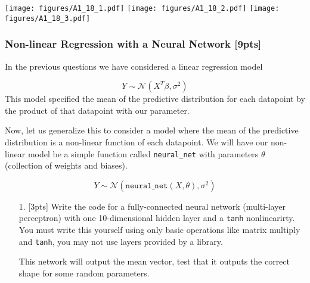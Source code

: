 \documentclass[12pt,a4paper]{article}
\begin{document}
\texttt{[image: figures/A1\_18\_1.pdf]}
\texttt{[image: figures/A1\_18\_2.pdf]}
\texttt{[image: figures/A1\_18\_3.pdf]}

\subsubsection{Non-linear Regression with a Neural Network [9pts]}
In the previous questions we have considered a linear regression model

\[
Y \sim \mathcal{N}(X^T \beta, \sigma^2)
\]
This model specified the mean of the predictive distribution for each datapoint by the product of that datapoint with our parameter.

Now, let us generalize this to consider a model where the mean of the predictive distribution is a non-linear function of each datapoint. We will have our non-linear model be a simple function called \texttt{neural\_net} with parameters $\theta$ (collection of weights and biases).

\[
Y \sim \mathcal{N}(\texttt{neural\_net}(X,\theta), \sigma^2)
\]
\begin{itemize}
\item[1. ] [3pts] Write the code for a fully-connected neural network (multi-layer perceptron) with one 10-dimensional hidden layer and a \texttt{tanh} nonlinearirty.  You must write this yourself using only basic operations like matrix multiply and \texttt{tanh}, you may not use layers provided by a library.

This network will output the mean vector, test that it outputs the correct shape for some random parameters.

\end{itemize}
\end{document}
